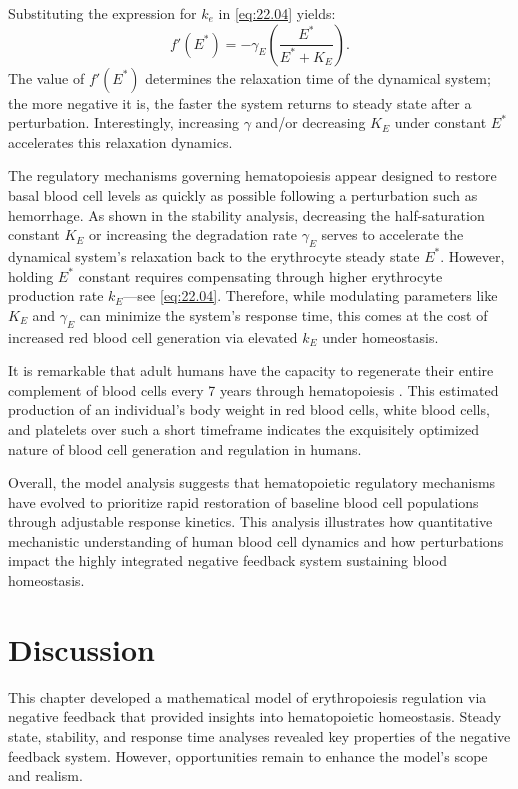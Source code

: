 Substituting the expression for $k_e$ in \eqref{eq:22.04} yields:
\begin{equation*}
f'(E^*) = - \gamma_E \left(\frac{E^*}{E^* + K_E}\right).
\end{equation*}
The value of $f'(E^*)$ determines the relaxation time of the dynamical system; the more negative it is, the faster the system returns to steady state after a perturbation. Interestingly, increasing $\gamma$ and/or decreasing $K_E$ under constant $E^*$ accelerates this relaxation dynamics.

The regulatory mechanisms governing hematopoiesis appear designed to restore basal blood cell levels as quickly as possible following a perturbation such as hemorrhage. As shown in the stability analysis, decreasing the half-saturation constant $K_E$ or increasing the degradation rate $\gamma_E$ serves to accelerate the dynamical system's relaxation back to the erythrocyte steady state $E^*$. However, holding $E^*$ constant requires compensating through higher erythrocyte production rate $k_E$---see \eqref{eq:22.04}. Therefore, while modulating parameters like $K_E$ and $\gamma_E$ can minimize the system's response time, this comes at the cost of increased red blood cell generation via elevated $k_E$ under homeostasis.

It is remarkable that adult humans have the capacity to regenerate their entire complement of blood cells every 7 years through hematopoiesis \citep{Mackey2001}. This estimated production of an individual's body weight in red blood cells, white blood cells, and platelets over such a short timeframe indicates the exquisitely optimized nature of blood cell generation and regulation in humans.

Overall, the model analysis suggests that hematopoietic regulatory mechanisms have evolved to prioritize rapid restoration of baseline blood cell populations through adjustable response kinetics. This analysis illustrates how quantitative mechanistic understanding of human blood cell dynamics and how perturbations impact the highly integrated negative feedback system sustaining blood homeostasis.

\section{Discussion}

This chapter developed a mathematical model of erythropoiesis regulation via negative feedback that provided insights into hematopoietic homeostasis. Steady state, stability, and response time analyses revealed key properties of the negative feedback system. However, opportunities remain to enhance the model's scope and realism.

